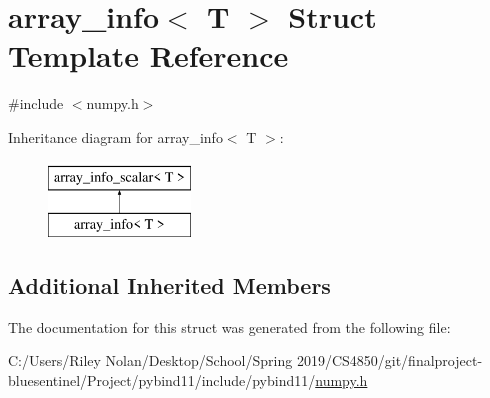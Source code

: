\hypertarget{structarray__info}{}\section{array\+\_\+info$<$ T $>$ Struct Template Reference}
\label{structarray__info}


{\ttfamily \#include $<$numpy.\+h$>$}

Inheritance diagram for array\+\_\+info$<$ T $>$\+:\begin{figure}[H]
\begin{center}
\leavevmode
\includegraphics[height=2.000000cm]{structarray__info}
\end{center}
\end{figure}
\subsection*{Additional Inherited Members}


The documentation for this struct was generated from the following file\+:\begin{DoxyCompactItemize}
\item 
C\+:/\+Users/\+Riley Nolan/\+Desktop/\+School/\+Spring 2019/\+C\+S4850/git/finalproject-\/bluesentinel/\+Project/pybind11/include/pybind11/\mbox{\hyperlink{numpy_8h}{numpy.\+h}}\end{DoxyCompactItemize}
